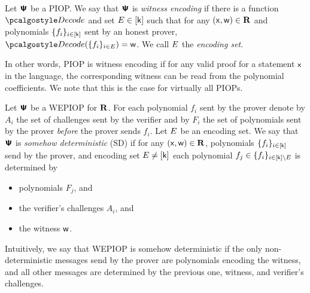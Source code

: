 \documentclass[runningheads,11pt]{llncs}
\begin{document}

\begin{definition}
  \label{def:wepiop}
  Let $\bm{\mathsf{\Psi}}$ be a PIOP.  We say that $\bm{\mathsf{\Psi}}$ is \emph{witness encoding} if there is
  a function $\decode$ and set $E \in [\mathsf{k}]$ such that for any
  $(\mathsf{x}, \mathsf{w}) \in \mathbf{R}$ and polynomials $\{f_i\}_{i \in [\mathsf{k}]}$ sent by an
  honest prover, $\decode(\smallset{f_i}_{i \in \encset}) = \wit$. We call $E$ the
  \emph{encoding set}.
\end{definition}
In other words, PIOP is witness encoding if for any valid proof for a statement
$\mathsf{x}$ in the language, the corresponding witness can be read from the
polynomial coefficients. We note that this is the case for virtually all
PIOPs. 

\begin{definition}
  \label{def:sdwepiop}
  Let $\bm{\mathsf{\Psi}}$ be a WEPIOP for $\mathbf{R}$. For each polynomial $f_i$ sent by the prover
  denote by $A_i$ the set of challenges sent by the verifier and by $F_i$ the
  set of polynomials sent by the prover \emph{before} the prover sends
  $f_i$. Let $E$ be an encoding set. We say that $\bm{\mathsf{\Psi}}$ is \emph{somehow
    deterministic} (SD) if for any $(\mathsf{x}, \mathsf{w}) \in \mathbf{R}$, polynomials
  $\{f_i\}_{i \in [\mathsf{k}]}$ send by the prover, and encoding set
  $E \neq [\mathsf{k}]$ each polynomial
  $f_j \in \{f_i\}_{i \in [\mathsf{k}] \setminus E}$ is determined by
  \begin{itemize}
    \item polynomials $F_j$, and
    \item the verifier's challenges $A_i$, and
    \item the witness $\mathsf{w}$.
  \end{itemize}
\end{definition}
Intuitively, we say that WEPIOP is somehow deterministic if the only
non-deterministic messages send by the prover are polynomials encoding the
witness, and all other messages are determined by the previous one, witness, and
verifier's challenges.
\end{document}
